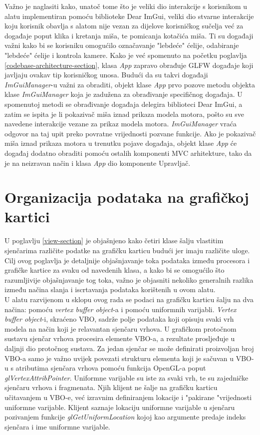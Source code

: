 \documentclass[times, utf8, diplomski]{fer}
\begin{document}
Važno je naglasiti kako, unatoč tome što je veliki dio interakcije s korisnikom u alatu implementiran pomoću biblioteke Dear ImGui, veliki dio stvarne interakcije koju korisnik obavlja s alatom nije vezan za dijelove korisničkog sučelja već za događaje poput klika i kretanja miša, te pomicanja kotačića miša. Ti su događaji važni kako bi se korisniku omogućilo označavanje "lebdeće" ćelije, odabiranje "lebdeće" ćelije i kontrola kamere. Kako je već spomenuto na početku poglavlja \ref{codebase-architecture-section}, klasa \textit{App} zapravo obrađuje GLFW događaje koji javljaju ovakav tip korisničkog unosa. Budući da su takvi događaji \textit{ImGuiManager}-u važni za obraditi, objekt klase \textit{App} prvo pozove metodu objekta klase \textit{ImGuiManager} koja je zadužena za obrađivanje specifičnog događaja. U spomenutoj metodi se obrađivanje događaja delegira biblioteci Dear ImGui, a zatim se ispita je li pokazivač miša iznad prikaza modela motora, pošto su sve navedene interakcije vezane za prikaz modela motora. \textit{ImGuiManager} vraća odgovor na taj upit preko povratne vrijednosti pozvane funkcije. Ako je pokazivač miša iznad prikaza motora u trenutku pojave događaja, objekt klase \textit{App} će događaj dodatno obraditi pomoću ostalih komponenti MVC arhitekture, tako da je na neizravan način i klasa \textit{App} dio komponente Upravljač.


\section{Organizacija podataka na grafičkoj kartici} \label{graphics-card-data-section}

U poglavlju \ref{view-section} je objašnjeno kako četiri klase šalju vlastitim sjenčarima različite podatke na grafičku karticu budući jer imaju različite uloge. Cilj ovog poglavlja je detaljnije objašnjavanje toka podataka između procesora i grafičke kartice za svaku od navedenih klasa, a kako bi se omogućilo što razumljivije objašnjavanje tog toka, važno je objasniti nekoliko generalnih razlika između načina slanja i iscrtavanja podataka korištenih u ovom alatu.\\

U alatu razvijenom u sklopu ovog rada se podaci na grafičku karticu šalju na dva načina: pomoću  \textit{vertex buffer object}-a i pomoću uniformnih varijabli. \textit{Vertex buffer object}-i, skraćeno VBO, sadrže polje podataka koji opisuju svaki vrh modela na način koji je relavantan sjenčaru vrhova. U grafičkom protočnom sustavu sjenčar vrhova procesira elemente VBO-a, a rezultate prosljeđuje u daljnji dio protočnog sustava. Za jedan sjenčar se može definirati proizvoljan broj VBO-a samo je važno uvijek povezati strukturu elementa koji je sačuvan u VBO-u s atributima sjenčara vrhova pomoću funkcija OpenGL-a poput \textit{glVertexAttribPointer}. Uniformne varijable su iste za svaki vrh, te su zajedničke sjenčaru vrhova i fragmenata. Njih klijent ne šalje na grafičku karticu učitavanjem u VBO-e, već izravnim definiranjem lokacije i "pakirane "vrijednosti uniformne varijable. Klijent saznaje lokaciju uniformne varijable u sjenčaru pozivanjem funkcije \textit{glGetUniformLocation} kojoj kao argumente predaje indeks sjenčara i ime uniformne varijable.\\
\end{document}
